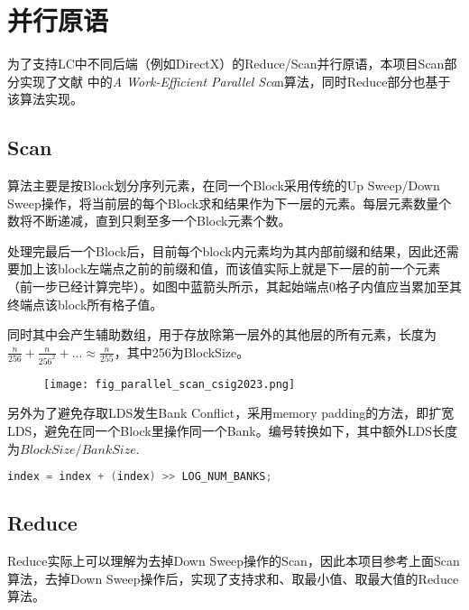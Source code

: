 \section{并行原语}
为了支持LC中不同后端（例如DirectX）的Reduce/Scan并行原语，本项目Scan部分实现了文献 \cite{harris2007parallel} 中的\textit{A Work-Efficient Parallel Sca}n算法，同时Reduce部分也基于该算法实现。

\subsection{Scan}
算法主要是按Block划分序列元素，在同一个Block采用传统的Up Sweep/Down Sweep操作，将当前层的每个Block求和结果作为下一层的元素。每层元素数量个数将不断递减，直到只剩至多一个Block元素个数。

处理完最后一个Block后，目前每个block内元素均为其内部前缀和结果，因此还需要加上该block左端点之前的前缀和值，而该值实际上就是下一层的前一个元素（前一步已经计算完毕）。如图中蓝箭头所示，其起始端点0格子内值应当累加至其终端点该block所有格子值。

同时其中会产生辅助数组，用于存放除第一层外的其他层的所有元素，长度为$\frac{n}{256}+\frac{n}{256^2}+...\approx\frac{n}{255}$，其中256为BlockSize。
\begin{figure}[H]
	\centering
	\texttt{[image: fig\_parallel\_scan\_csig2023.png]}
\end{figure}
另外为了避免存取LDS发生Bank Conflict，采用memory padding的方法，即扩宽LDS，避免在同一个Block里操作同一个Bank。编号转换如下，其中额外LDS长度为$BlockSize / BankSize$.
\begin{lstlisting}[language=C++]
index = index + (index) >> LOG_NUM_BANKS;
\end{lstlisting}

\subsection{Reduce}
Reduce实际上可以理解为去掉Down Sweep操作的Scan，因此本项目参考上面Scan算法，去掉Down Sweep操作后，实现了支持求和、取最小值、取最大值的Reduce算法。